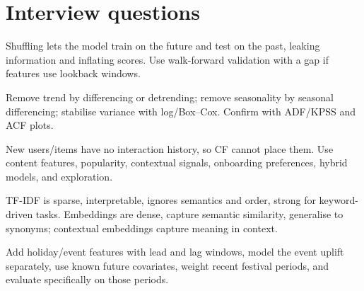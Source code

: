 \section{Interview questions}
\A Shuffling lets the model train on the future and test on the past, leaking information and inflating scores. Use walk-forward validation with a gap if features use lookback windows.

\A Remove trend by differencing or detrending; remove seasonality by seasonal differencing; stabilise variance with log/Box--Cox. Confirm with ADF/KPSS and ACF plots.

\A New users/items have no interaction history, so CF cannot place them. Use content features, popularity, contextual signals, onboarding preferences, hybrid models, and exploration.

\A TF-IDF is sparse, interpretable, ignores semantics and order, strong for keyword-driven tasks. Embeddings are dense, capture semantic similarity, generalise to synonyms; contextual embeddings capture meaning in context.

\A Add holiday/event features with lead and lag windows, model the event uplift separately, use known future covariates, weight recent festival periods, and evaluate specifically on those periods.
